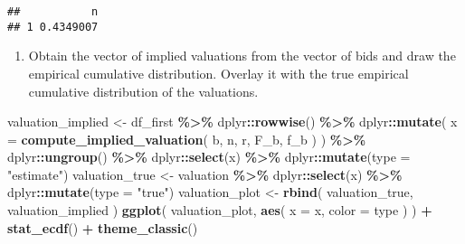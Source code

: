 \documentclass[
]{book}
\newenvironment{Shaded}{\begin{snugshade}}{\end{snugshade}}
\newcommand{\AttributeTok}[1]{\textcolor[rgb]{0.13,0.29,0.53}{#1}}
\newcommand{\FunctionTok}[1]{\textcolor[rgb]{0.13,0.29,0.53}{\textbf{#1}}}
\newcommand{\NormalTok}[1]{#1}
\newcommand{\OtherTok}[1]{\textcolor[rgb]{0.56,0.35,0.01}{#1}}
\newcommand{\SpecialCharTok}[1]{\textcolor[rgb]{0.81,0.36,0.00}{\textbf{#1}}}
\newcommand{\StringTok}[1]{\textcolor[rgb]{0.31,0.60,0.02}{#1}}
\providecommand{\tightlist}{%
  \setlength{\itemsep}{0pt}\setlength{\parskip}{0pt}}
\begin{document}
\begin{verbatim}
##           n
## 1 0.4349007
\end{verbatim}

\begin{enumerate}
\def\labelenumi{\arabic{enumi}.}
\setcounter{enumi}{12}
\tightlist
\item
  Obtain the vector of implied valuations from the vector of bids and draw the empirical cumulative distribution. Overlay it with the true empirical cumulative distribution of the valuations.
\end{enumerate}

\begin{Shaded}
\begin{Highlighting}[]
\NormalTok{valuation\_implied }\OtherTok{\textless{}{-}} 
\NormalTok{  df\_first }\SpecialCharTok{\%\textgreater{}\%}
\NormalTok{  dplyr}\SpecialCharTok{::}\FunctionTok{rowwise}\NormalTok{() }\SpecialCharTok{\%\textgreater{}\%}
\NormalTok{  dplyr}\SpecialCharTok{::}\FunctionTok{mutate}\NormalTok{(}
    \AttributeTok{x =} \FunctionTok{compute\_implied\_valuation}\NormalTok{(}
\NormalTok{      b, }
\NormalTok{      n,}
\NormalTok{      r,}
\NormalTok{      F\_b, }
\NormalTok{      f\_b}
\NormalTok{      )}
\NormalTok{    ) }\SpecialCharTok{\%\textgreater{}\%}
\NormalTok{  dplyr}\SpecialCharTok{::}\FunctionTok{ungroup}\NormalTok{() }\SpecialCharTok{\%\textgreater{}\%}
\NormalTok{  dplyr}\SpecialCharTok{::}\FunctionTok{select}\NormalTok{(x) }\SpecialCharTok{\%\textgreater{}\%}
\NormalTok{  dplyr}\SpecialCharTok{::}\FunctionTok{mutate}\NormalTok{(}\AttributeTok{type =} \StringTok{"estimate"}\NormalTok{)}
\NormalTok{valuation\_true }\OtherTok{\textless{}{-}} 
\NormalTok{  valuation }\SpecialCharTok{\%\textgreater{}\%}
\NormalTok{  dplyr}\SpecialCharTok{::}\FunctionTok{select}\NormalTok{(x) }\SpecialCharTok{\%\textgreater{}\%}
\NormalTok{  dplyr}\SpecialCharTok{::}\FunctionTok{mutate}\NormalTok{(}\AttributeTok{type =} \StringTok{"true"}\NormalTok{)}
\NormalTok{valuation\_plot }\OtherTok{\textless{}{-}} 
  \FunctionTok{rbind}\NormalTok{(}
\NormalTok{    valuation\_true,}
\NormalTok{    valuation\_implied}
\NormalTok{    )}
\FunctionTok{ggplot}\NormalTok{(}
\NormalTok{  valuation\_plot,}
  \FunctionTok{aes}\NormalTok{(}
    \AttributeTok{x =}\NormalTok{ x, }
    \AttributeTok{color =}\NormalTok{ type}
\NormalTok{    )}
\NormalTok{  ) }\SpecialCharTok{+} 
  \FunctionTok{stat\_ecdf}\NormalTok{() }\SpecialCharTok{+} 
  \FunctionTok{theme\_classic}\NormalTok{()}
\end{Highlighting}
\end{Shaded}
\end{document}
